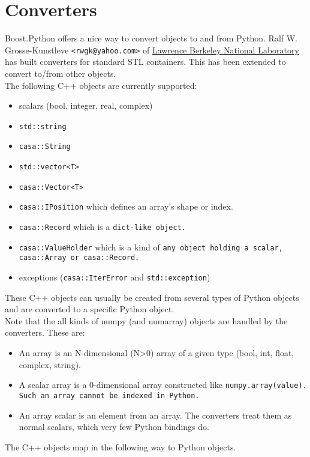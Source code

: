 \section{Converters}
Boost.Python offers a nice way to convert objects to and from Python.
Ralf W. Grosse-Kunstleve {\tt<rwgk@yahoo.com>} of
\href{http://www.lbl.gov}{Lawrence Berkeley National Laboratory}
has built converters for standard STL containers. This has been
extended to convert to/from other objects.
\\The following C++ objects are currently supported:
\begin{itemize}
  \item scalars (bool, integer, real, complex)
  \item \texttt{std::string}
  \item \texttt{casa::String}
  \item \texttt{std::vector<T>}
  \item \texttt{casa::Vector<T>}
  \item \texttt{casa::IPosition} which defines an array's shape or index.
  \item \texttt{casa::Record} which is a \tt{dict}-like object.
  \item \texttt{casa::ValueHolder} which is a kind of \tt{any} object
    holding a scalar, casa::Array or casa::Record.
  \item exceptions (\texttt{casa::IterError} and \texttt{std::exception})
\end{itemize}
These C++ objects can usually be created from several types of Python
objects and are converted to a specific Python object.
\\Note that the all kinds of numpy (and numarray) objects are
handled by the converters. These are:
\begin{itemize}
\item An array is an N-dimensional (N>0) array of a given type
  (bool, int, float, complex, string).
\item A scalar array is a 0-dimensional array constructed like
  \tt{numpy.array(value)}. Such an array cannot be indexed in Python.
\item An array scalar is an element from an array. The converters
  treat them as normal scalars, which very few Python bindings do.
\end{itemize}
The C++ objects map in the following way to Python objects.
